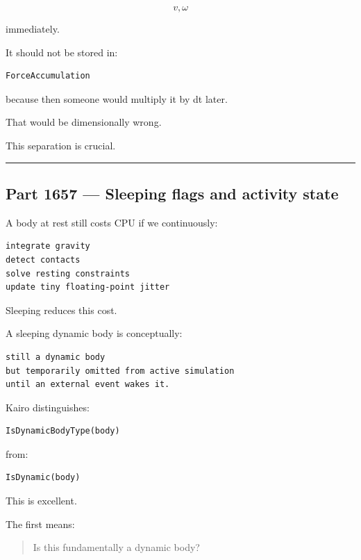 \[
v,\omega
\]

immediately.

It should not be stored in:

\begin{verbatim}
ForceAccumulation
\end{verbatim}

because then someone would multiply it by dt later.

That would be dimensionally wrong.

This separation is crucial.

\begin{center}\rule{0.5\linewidth}{0.5pt}\end{center}

\subsection{Part 1657 --- Sleeping flags and activity state}\label{06-engine-ii-ch037-part-1657-sleeping-flags-and-activity-state}

\hypertarget{06-engine-ii-ch037-part-1657-sleeping-flags-and-activity-state}{}

A body at rest still costs CPU if we continuously:

\begin{verbatim}
integrate gravity
detect contacts
solve resting constraints
update tiny floating-point jitter
\end{verbatim}

Sleeping reduces this cost.

A sleeping dynamic body is conceptually:

\begin{verbatim}
still a dynamic body
but temporarily omitted from active simulation
until an external event wakes it.
\end{verbatim}

Kairo distinguishes:

\begin{verbatim}
IsDynamicBodyType(body)
\end{verbatim}

from:

\begin{verbatim}
IsDynamic(body)
\end{verbatim}

This is excellent.

The first means:

\begin{quote}
Is this fundamentally a dynamic body?
\end{quote}

